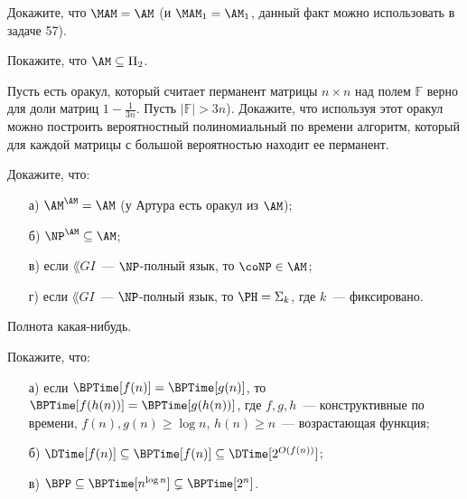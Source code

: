 
\begin{task}
    Докажите, что $\MAM = \AM$ (и $\MAM_1 = \AM_1$, данный факт можно использовать в задаче 57).
\end{task}

\begin{task}
    Покажите, что $\AM \subseteq \Pi_2$.
\end{task}

\begin{task}
    Пусть есть оракул, который считает перманент матрицы $n \times n$ над полем $\mathbb{F}$ верно для доли матриц
    $1 - \frac{1}{3n}$. Пусть $|\mathbb{F}| > 3n$). Докажите, что используя этот оракул можно построить вероятностный
    полиномиальный по времени алгоритм, который для каждой матрицы с большой вероятностью находит ее перманент.
\end{task}

\begin{task}
	Докажите, что если $\NP \subseteq \PCP}(o(\log n), 1)$, то $\P = \NP$.    
\end{task}


\begin{task}
    Докажите, что:
    \begin{enumerate}[topsep = 0pt, itemsep = -1ex]
        \item [а)] $\AM^{\AM} = \AM$ (у Артура есть оракул из $\AM$);
        \item [б)] $\NP^{\AM} \subseteq \AM$;
        \item [в)] если $\lang{GI}$~--- $\NP$-полный язык, то $\coNP \in \AM$;
        \item [г)] если $\lang{GI}$~--- $\NP$-полный язык, то $\PH = \Sigma_k$, где $k$~--- фиксировано.
    \end{enumerate}
\end{task}

\begin{task}
    Полнота какая-нибудь.
\end{task}

\breakline


\begin{ptask}{44}
    Покажите, что:
	\begin{enumerate}[topsep = 0pt, itemsep = -1ex]
        \item [а)] если $\BPTime[f(n)] = \BPTime[g(n)]$, то $\BPTime[f(h(n))] = \BPTime[g(h(n))]$, где $f, g, h$~---
			конструктивные по времени, $f(n), g(n) \ge \log n$, $h(n) \ge n$~--- возрастающая функция;
        \item [б)] $\DTime[f(n)] \subseteq \BPTime[f(n)] \subseteq \DTime[2^{O(f(n))}]$;
        \item [в)] $\BPP \subseteq \BPTime[n^{\log n}] \subsetneq \BPTime[2^n]$.
    \end{enumerate}
\end{ptask}


